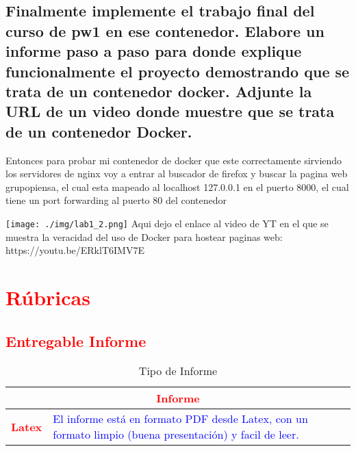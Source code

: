 \documentclass[10pt]{article}
\begin{document}
	\subsection{Finalmente implemente el trabajo final del curso de pw1 en ese contenedor. \newline
	Elabore un informe paso a paso para donde explique funcionalmente el proyecto demostrando  que se trata de un contenedor docker.\newline
	Adjunte la URL de un video donde muestre que se trata de un contenedor Docker. \newline}

	Entonces para probar mi contenedor de docker que este correctamente sirviendo los servidores de nginx voy a entrar al buscador de firefox 
	y buscar la pagina web grupopiensa, el cual esta mapeado al localhost 127.0.0.1 en el puerto 8000, el cual tiene un port forwarding
	al puerto 80 del contenedor

	\texttt{[image: ./img/lab1\_2.png]}
	\newline
	Aqui dejo el enlace al video de YT en el que se muestra la veracidad del uso de Docker para hostear paginas web: https://youtu.be/ERklT6IMV7E

\pagebreak

	\section{\textcolor{red}{Rúbricas}}
	
	\subsection{\textcolor{red}{Entregable Informe}}
	\begin{table}[H]
		\caption{Tipo de Informe}
		\setlength{\tabcolsep}{0.5em} %
		{\renewcommand{\arraystretch}{1.5}%
		\begin{tabular}{|p{3cm}|p{12cm}|}
			\hline
			\multicolumn{2}{|c|}{\textbf{\textcolor{red}{Informe}}}  \\
			\hline 
			\textbf{\textcolor{red}{Latex}} & \textcolor{blue}{El informe está en formato PDF desde Latex,  con un formato limpio (buena presentación) y facil de leer.}   \\ 
			\hline 
			
			
		\end{tabular}
	}
	\end{table}
	
\end{document}
